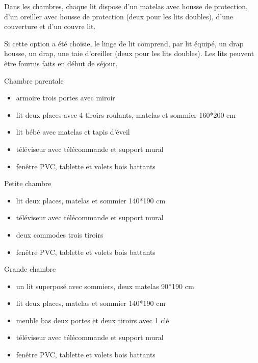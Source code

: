 \documentclass[a4paper,11pt]{article}
\begin{document}
Dans les chambres, chaque lit dispose d'un matelas avec housse de protection, d'un oreiller avec housse de protection (deux pour les lits doubles),  d'une couverture et d'un couvre lit.

Si cette option a été choisie, le linge de lit comprend, par lit équipé, un drap housse, un drap, une taie d'oreiller (deux pour les lits doubles). Les lits peuvent être fournis faits en début de séjour.
\vspace{0.5cm}


\vspace{0.25cm}

Chambre parentale
\begin{itemize}
\item armoire trois portes avec miroir
\item lit deux places avec 4 tiroirs roulants, matelas et sommier 160*200 cm
\item lit bébé avec matelas et tapis d'éveil
\item téléviseur avec télécommande et support mural
\item fenêtre PVC, tablette et volets bois battants
\end{itemize}

\vspace{0.5cm}

Petite chambre
\begin{itemize}
\item lit deux places, matelas et sommier 140*190 cm
\item téléviseur avec télécommande et support mural
\item deux commodes trois tiroirs
\item fenêtre PVC, tablette et volets bois battants
\end{itemize}


\vspace{0.25cm}

Grande chambre
\begin{itemize}
\item un lit superposé avec sommiers, deux matelas 90*190 cm
\item lit deux places, matelas et sommier 140*190 cm
\item meuble bas deux portes et deux tiroirs avec 1 clé 
\item téléviseur avec télécommande et support mural
\item fenêtre PVC, tablette et volets bois battants
\end{itemize}
\vspace{0.25cm}
\end{document}
